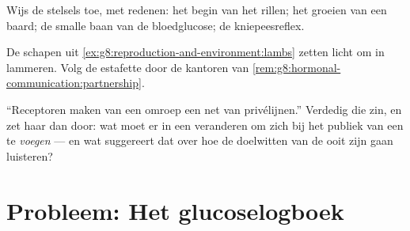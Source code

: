 \begin{exercise}[$\star\star$]\label{exo:g8:hormonal-communication:10}
Wijs de stelsels toe, met redenen: het begin van het rillen; het groeien
van een baard; de smalle baan van de bloedglucose; de kniepeesreflex.
\end{exercise}

\begin{exercise}[$\star\star$]\label{exo:g8:hormonal-communication:11}
De schapen uit \cref{ex:g8:reproduction-and-environment:lambs} zetten licht
om in lammeren. Volg de estafette door de kantoren van
\cref{rem:g8:hormonal-communication:partnership}.
\end{exercise}

\begin{exercise}[$\star\star\star$]\label{exo:g8:hormonal-communication:12}
``Receptoren maken van een omroep een net van privélijnen.'' Verdedig die
zin, en zet haar dan door: wat moet er in een  veranderen om zich bij
het publiek van een  te \emph{voegen} --- en wat suggereert dat over
hoe de doelwitten van de  ooit zijn gaan luisteren?
\end{exercise}

\section{Probleem: Het glucoselogboek}

